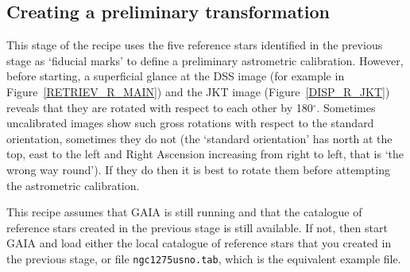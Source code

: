 \documentclass[twoside,11pt]{article}
\renewcommand{\_}{\texttt{\symbol{95}}}
\begin{document}
\subsection{Creating a preliminary transformation}

This stage of the recipe uses the five reference stars identified in the
previous stage as `fiducial marks' to define a preliminary astrometric
calibration.  However, before starting, a superficial glance at the
DSS image (for example in Figure~\ref{RETRIEV_R_MAIN}) and the
JKT image (Figure~\ref{DISP_R_JKT}) reveals that they are rotated with
respect to each other by 180$^{\circ}$.  Sometimes uncalibrated images
show such gross rotations with respect to the standard orientation,
sometimes they do not (the `standard orientation' has north at the top,
east to the left and Right Ascension increasing from right to left, that
is `the wrong way round').  If they do then it is best to rotate them
before attempting the astrometric calibration.

This recipe assumes that GAIA is still running and that the catalogue of
reference stars created in the previous stage is still available.  If not,
then start GAIA and load either the local catalogue of reference stars
that you created in the previous stage, or file  {\tt ngc1275usno.tab},
which is the equivalent example file.
\end{document}

